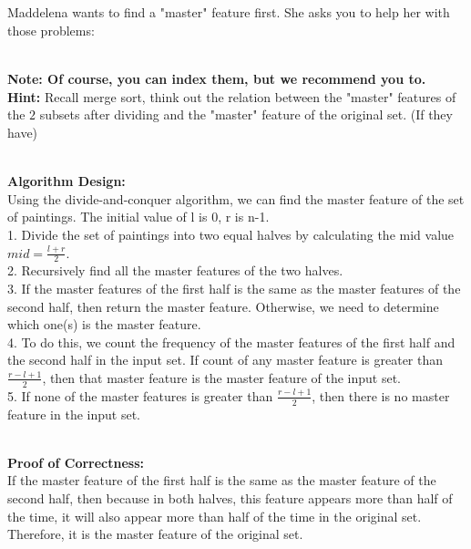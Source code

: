 \begin{parts}
\part{} 
Maddelena wants to find a "master" feature first. She asks you to help her with those problems:
\begin{subparts}
     \\
    \textbf{Note: Of course, you can index them, but we recommend you  to.} \\
    \textbf{Hint:} Recall merge sort, think out the relation between the "master" features of the $2$ subsets after dividing and the "master" feature of the original set. (If they have)
    \begin{solution} 
        \\
        \textbf{Algorithm Design:} \\
        Using the divide-and-conquer algorithm, we can find the master feature of the set of paintings. The initial value of l is 0, r is n-1. \\
        1. Divide the set of paintings into two equal halves by calculating the mid value $mid = \frac{l+r}{2}$. \\
        2. Recursively find all the master features of the two halves. \\
        3. If the master features of the first half is the same as the master features of the second half, then return the master feature. Otherwise, we need to determine which one(s) is the master feature. \\
        4. To do this, we count the frequency of the master features of the first half and the second half in the input set. If count of any master feature is greater than $ \frac{r-l+1}{2}$, then that master feature is the master feature of the input set. \\
        5. If none of the master features is greater than $ \frac{r-l+1}{2}$, then there is no master feature in the input set. \\
    \end{solution}
    \begin{solution} 
        \\
        \textbf{Proof of Correctness:} \\
        If the master feature of the first half is the same as the master feature of the second half, then because in both halves, this feature appears more than half of the time, it will also appear more than half of the time in the original set. Therefore, it is the master feature of the original set. \\

\end{solution}
\end{subparts}
\end{parts}
